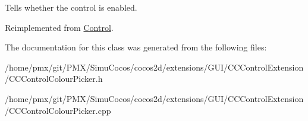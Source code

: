 Tells whether the control is enabled. 

Reimplemented from \hyperlink{classControl_a55339ae920182245d5ec114c33f4b1fd}{Control}.



The documentation for this class was generated from the following files\+:\begin{DoxyCompactItemize}
\item 
/home/pmx/git/\+P\+M\+X/\+Simu\+Cocos/cocos2d/extensions/\+G\+U\+I/\+C\+C\+Control\+Extension/C\+C\+Control\+Colour\+Picker.\+h\item 
/home/pmx/git/\+P\+M\+X/\+Simu\+Cocos/cocos2d/extensions/\+G\+U\+I/\+C\+C\+Control\+Extension/C\+C\+Control\+Colour\+Picker.\+cpp\end{DoxyCompactItemize}
